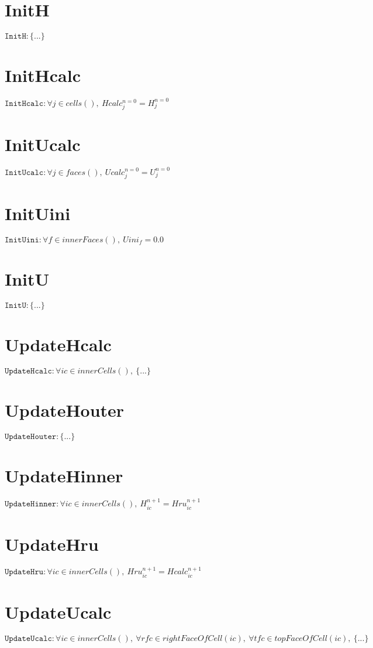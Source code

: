 \documentclass[11pt]{article}
\begin{document}
\section{InitH}
$\texttt{InitH} : \{ ... \}$


\section{InitHcalc}
$\texttt{InitHcalc} : \forall{j\in cells()}, \ Hcalc^{n=0}_{j} = H^{n=0}_{j}$


\section{InitUcalc}
$\texttt{InitUcalc} : \forall{j\in faces()}, \ Ucalc^{n=0}_{j} = U^{n=0}_{j}$


\section{InitUini}
$\texttt{InitUini} : \forall{f\in innerFaces()}, \ Uini_{f} = 0.0$


\section{InitU}
$\texttt{InitU} : \{ ... \}$


\section{UpdateHcalc}
$\texttt{UpdateHcalc} : \forall{ic\in innerCells()}, \ \{ ... \}$


\section{UpdateHouter}
$\texttt{UpdateHouter} : \{ ... \}$


\section{UpdateHinner}
$\texttt{UpdateHinner} : \forall{ic\in innerCells()}, \ H^{n+1}_{ic} = Hru^{n+1}_{ic}$


\section{UpdateHru}
$\texttt{UpdateHru} : \forall{ic\in innerCells()}, \ Hru^{n+1}_{ic} = Hcalc^{n+1}_{ic}$


\section{UpdateUcalc}
$\texttt{UpdateUcalc} : \forall{ic\in innerCells()}, \ \forall{rfc\in rightFaceOfCell(ic)}, \ \forall{tfc\in topFaceOfCell(ic)}, \ \{ ... \}$
\end{document}
